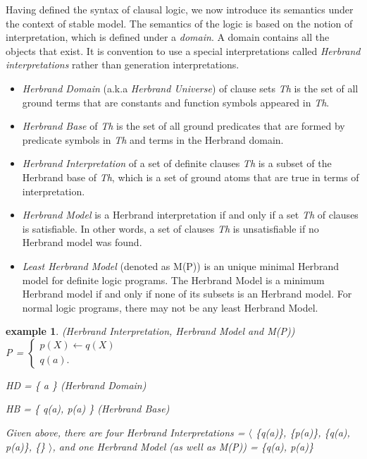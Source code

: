 \documentclass[12pt,twoside]{report}
\newtheorem{examp}{example}[section]
\begin{document}
Having defined the syntax of clausal logic, we now introduce its semantics under the context of stable model. The semantics of the logic is based on the notion of interpretation, which is defined under a \textit{domain}. A domain contains all the objects that exist. It is convention to use a special interpretations called \textit{Herbrand interpretations} rather than generation interpretations.
\begin{itemize}
\item \textit{Herbrand Domain} (a.k.a \textit{Herbrand Universe}) of clause sets \textit{Th} is the set of all ground terms that are constants and function symbols appeared in \textit{Th}.
\item \textit{Herbrand Base} of \textit{Th} is the set of all ground predicates that are formed by predicate symbols in \textit{Th} and terms in the Herbrand domain.
\item \textit{Herbrand Interpretation} of a set of definite clauses \textit{Th} is a subset of the Herbrand base of \textit{Th}, which is a set of ground atoms that are true in terms of interpretation.
\item \textit{Herbrand Model} is a Herbrand interpretation if and only if a set \textit{Th} of clauses is satisfiable. In other words, a set of clauses \textit{Th} is unsatisfiable if no Herbrand model was found. 
\item \textit{Least Herbrand Model} (denoted as M(P)) is an unique minimal Herbrand model for definite logic programs.  The Herbrand Model is a minimum Herbrand model if and only if none of its subsets is an Herbrand model. For normal logic programs, there may not be any least Herbrand Model.

\end{itemize}

\begin{examp} \normalfont (Herbrand Interpretation, Herbrand Model and M(P)) \\

P = $\begin{cases}
	p(X)  \leftarrow q(X) \\
	q (a).
      \end{cases}$

HD = \{ a \} (Herbrand Domain)

HB = \{ q(a), p(a) \} (Herbrand Base)

Given above,  there are four Herbrand Interpretations = $\langle$ \{q(a)\}, \{p(a)\}, \{q(a), p(a)\}, \{\} $\rangle$, and one Herbrand Model (as well as M(P)) = \{q(a), p(a)\}

\end{examp}
\end{document}
